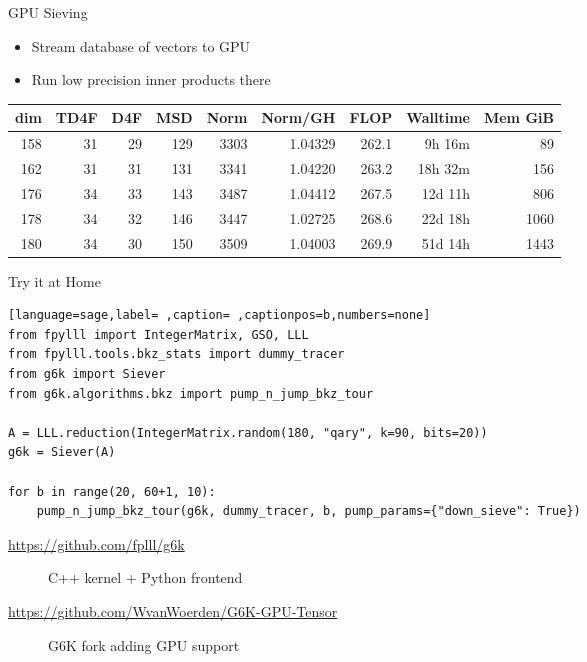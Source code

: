 \documentclass[table,10pt,aspectratio=169]{beamer}
\begin{document}
\begin{frame}[label={sec:org16c7a02}]{GPU Sieving}
\begin{itemize}
\item Stream database of vectors to GPU
\item Run low precision inner products there
\end{itemize}

\begin{center}
\begin{tabular}{rrrrrrrrr}
\toprule
dim & TD4F & D4F & MSD & Norm & Norm/GH & FLOP & Walltime & Mem GiB\\[0pt]
\midrule
158 & 31 & 29 & 129 & 3303 & 1.04329 & 262.1 & 9h 16m & 89\\[0pt]
162 & 31 & 31 & 131 & 3341 & 1.04220 & 263.2 & 18h 32m & 156\\[0pt]
176 & 34 & 33 & 143 & 3487 & 1.04412 & 267.5 & 12d 11h & 806\\[0pt]
178 & 34 & 32 & 146 & 3447 & 1.02725 & 268.6 & 22d 18h & 1060\\[0pt]
180 & 34 & 30 & 150 & 3509 & 1.04003 & 269.9 & 51d 14h & 1443\\[0pt]
\bottomrule
\end{tabular}

\end{center}

\scriptsize

\end{frame}

\begin{frame}[label={sec:orga626750},fragile]{Try it at Home}
 \begin{lstlisting}[language=sage,label= ,caption= ,captionpos=b,numbers=none]
from fpylll import IntegerMatrix, GSO, LLL
from fpylll.tools.bkz_stats import dummy_tracer
from g6k import Siever
from g6k.algorithms.bkz import pump_n_jump_bkz_tour

A = LLL.reduction(IntegerMatrix.random(180, "qary", k=90, bits=20))
g6k = Siever(A)

for b in range(20, 60+1, 10):
    pump_n_jump_bkz_tour(g6k, dummy_tracer, b, pump_params={"down_sieve": True})
\end{lstlisting}

\begin{description}
\item[{\url{https://github.com/fplll/g6k}}] C++ kernel + Python frontend
\item[{\url{https://github.com/WvanWoerden/G6K-GPU-Tensor}}] G6K fork adding GPU support
\end{description}
\end{frame}
\end{document}
